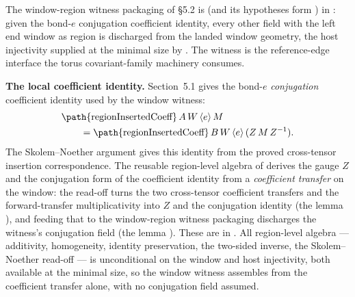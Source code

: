 \documentclass{article}
\begin{document}
The window-region witness packaging of \S5.2 is
 (and its hypotheses form
) in
: given the bond-$e$ conjugation coefficient
identity, every other  field with the left end window
as region is discharged from the landed window geometry, the host injectivity supplied
at the minimal size by .  The
witness is the reference-edge interface the torus covariant-family machinery consumes.

\medskip
\noindent\textbf{The local coefficient identity.} Section~5.1 gives the
bond-$e$ \emph{conjugation} coefficient identity used by the window witness:
\begin{align*}
    &\text{\path{regionInsertedCoeff}}\,A\,W\,\langle e\rangle\,M\\
    &\qquad = \text{\path{regionInsertedCoeff}}\,B\,W\,\langle e\rangle\,(Z\,M\,Z^{-1}).
\end{align*}
The Skolem--Noether
argument gives this identity from the proved cross-tensor insertion correspondence.
The reusable region-level algebra of  derives the gauge
$Z$ and the conjugation form of the coefficient identity from a \emph{coefficient
    transfer} on the window: the read-off 
turns the two cross-tensor coefficient transfers and the forward-transfer multiplicativity
into $Z$ and the conjugation identity (the lemma
), and feeding that to the
window-region witness packaging discharges the witness's conjugation field (the lemma
).  These are in
.  All region-level algebra --- additivity,
homogeneity, identity preservation, the two-sided inverse, the Skolem--Noether read-off
--- is unconditional on the window and host injectivity, both available at the minimal
size, so the window witness assembles from the coefficient transfer alone, with no
conjugation field assumed.
\end{document}
